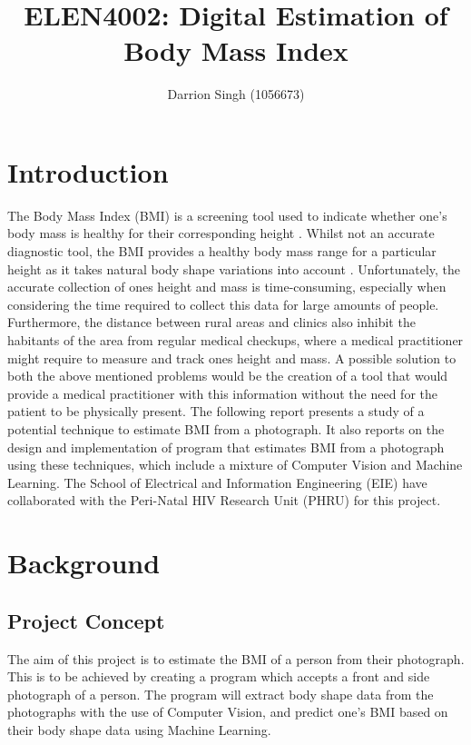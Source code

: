 \documentclass[conference]{IEEEtran}
\title{\huge{ELEN4002: Digital Estimation of Body Mass Index} \vspace{-6pt}}
\author{Darrion Singh (1056673) \vspace{-6pt}}
\begin{document}
\vspace{-6pt}
\maketitle

\begin{abstract}
	
\end{abstract}

\section{Introduction}
The Body Mass Index (BMI) is a screening tool used to indicate whether one's body mass is healthy for their corresponding height \cite{nhsBMI}.
Whilst not an accurate diagnostic tool, the BMI provides a healthy body mass range for a particular height as it takes natural body shape variations into account \cite{nhsBMI}.
Unfortunately, the accurate collection of ones height and mass is time-consuming, especially when considering the time required to collect this data for large amounts of people.
Furthermore, the distance between rural areas and clinics also inhibit the habitants of the area from regular medical checkups, where a medical practitioner might require to measure and track ones height and mass.
A possible solution to both the above mentioned problems would be the creation of a tool that would provide a medical practitioner with this information without the need for the patient to be physically present.
The following report presents a study of a potential technique to estimate BMI from a photograph. It also reports on the design and implementation of program that estimates BMI from a photograph using these techniques, which include a mixture of Computer Vision and Machine Learning.
The School of Electrical and Information Engineering (EIE) have collaborated with the Peri-Natal HIV Research Unit (PHRU) for this project.
\section{Background}
\subsection{Project Concept}
The aim of this project is to estimate the BMI of a person from their photograph.
This is to be achieved by creating a program which accepts a front and side photograph of a person.
The program will extract body shape data from the photographs with the use of Computer Vision, and predict one's BMI based on their body shape data using Machine Learning.
\end{document}
